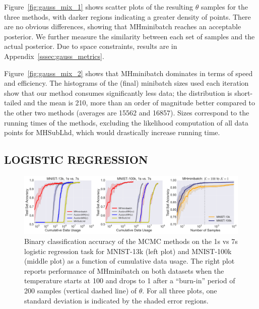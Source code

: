 \documentclass[letterpaper]{article}
\begin{document}
Figure~\ref{fig:gauss_mix_1} shows scatter plots of the resulting $\theta$
samples for the three methods, with darker regions indicating a greater density
of points. There are no obvious differences, showing that {\sc MHminibatch}
reaches an acceptable posterior. We further measure the similarity between each
set of samples and the actual posterior. Due to space constraints, results are
in Appendix~\ref{sssec:gauss_metrics}.

Figure~\ref{fig:gauss_mix_2} shows that {\sc MHminibatch} dominates in terms of
speed and efficiency. The histograms of the (final) minibatch sizes used each
iteration show that our method consumes significantly less data; the
distribution is short-tailed and the mean is 210, more than an order of
magnitude better compared to the other two methods (averages are 15562 and
16857). Sizes correspond to the running times of the methods, excluding the
likelihood computation of all data points for {\sc MHSubLhd}, which would
drastically increase running time.


\subsection{LOGISTIC REGRESSION}\label{ssec:logistic}

\begin{figure}[t]
	\centering
	\includegraphics[width=1.0\linewidth]{logistic_regression_error_regions.png}
	\caption{
    Binary classification accuracy of the MCMC methods on the 1s vs 7s logistic
    regression task for MNIST-13k (left plot) and MNIST-100k (middle plot) as a
    function of cumulative data usage.  The right plot reports performance of
    {\sc MHminibatch} on both datasets when the temperature starts at 100 and
    drops to 1 after a ``burn-in'' period of 200 samples (vertical dashed line)
    of $\theta$.  For all three plots, one standard deviation is indicated by
    the shaded error regions.
    }
	\label{fig:logistic_performance}
\end{figure}
\end{document}

